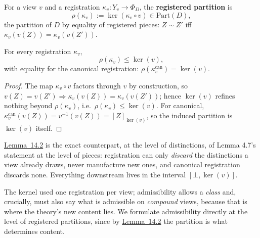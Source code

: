 
\begin{thmdef}

For a view \(v\) and a registration \(\kappa_v:Y_v\to\Phi_D\), the \textbf{registered partition} is
\[
\rho(\kappa_v):=\ker(\kappa_v\circ v)\in\mathrm{Part}(D),
\]
the partition of \(D\) by equality of registered pieces: \(Z\sim Z'\) iff \(\kappa_v(v(Z))=\kappa_v(v(Z'))\).
\end{thmdef}

\begin{thmplain}

For every registration \(\kappa_v\),
\[
\rho(\kappa_v)\le\ker(v),
\]
with equality for the canonical registration: \(\rho(\kappa^{\mathrm{can}}_v)=\ker(v)\).
\end{thmplain}

\begin{proof}

The map \(\kappa_v\circ v\) factors through \(v\) by construction, so \(v(Z)=v(Z')\Rightarrow\kappa_v(v(Z))=\kappa_v(v(Z'))\); hence \(\ker(v)\) refines nothing beyond \(\rho(\kappa_v)\), i.e.~\(\rho(\kappa_v)\le\ker(v)\). For canonical, \(\kappa^{\mathrm{can}}_v(v(Z))=v^{-1}(v(Z))=[Z]_{\ker(v)}\), so the induced partition is \(\ker(v)\) itself.
\end{proof}

\hyperlink{stmt:14.2}{Lemma~14.2} is the exact counterpart, at the level of distinctions, of Lemma 4.7's statement at the level of pieces: registration can only \emph{discard} the distinctions a view already draws, never manufacture new ones, and canonical registration discards none. Everything downstream lives in the interval \([\bot,\ker(v)]\).


The kernel used one registration per view; admissibility allows a \emph{class} and, crucially, must also say what is admissible on \emph{compound} views, because that is where the theory's new content lies. We formulate admissibility directly at the level of registered partitions, since by \hyperlink{stmt:14.2}{Lemma~14.2} the partition is what determines content.

